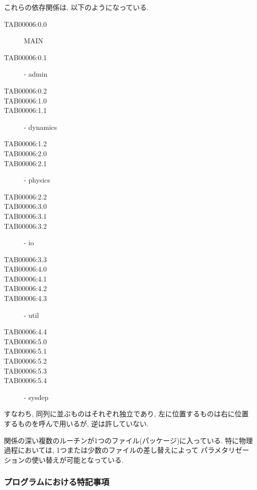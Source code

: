 これらの依存関係は, 以下のようになっている. 
\begin{center}
\begin{description}
\item[TAB00006:0.0] MAIN
\item[TAB00006:0.1] - admin
\item[TAB00006:0.2] 
\item[TAB00006:1.0] 
\item[TAB00006:1.1] - dynamics
\item[TAB00006:1.2] 
\item[TAB00006:2.0] 
\item[TAB00006:2.1] - physics
\item[TAB00006:2.2] 
\item[TAB00006:3.0] 
\item[TAB00006:3.1] 
\item[TAB00006:3.2] - io
\item[TAB00006:3.3] 
\item[TAB00006:4.0] 
\item[TAB00006:4.1] 
\item[TAB00006:4.2] 
\item[TAB00006:4.3] - util
\item[TAB00006:4.4] 
\item[TAB00006:5.0] 
\item[TAB00006:5.1] 
\item[TAB00006:5.2] 
\item[TAB00006:5.3] 
\item[TAB00006:5.4] - sysdep
\end{description}
\end{center}
すなわち, 同列に並ぶものはそれぞれ独立であり,
左に位置するものは右に位置するものを呼んで用いるが, 逆は許していない.

関係の深い複数のルーチンが1つのファイル(パッケージ)に入っている.
特に物理過程においては, 1つまたは少数のファイルの差し替えによって
パラメタリゼーションの使い替えが可能となっている.

\subsubsection{プログラムにおける特記事項}

